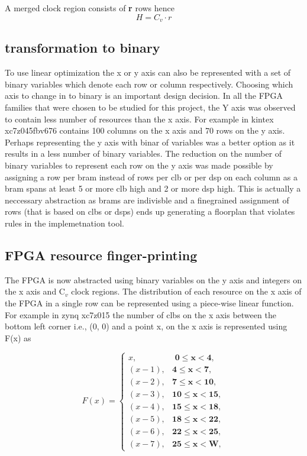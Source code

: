 \documentclass[conference]{IEEEtran}
\begin{document}
A merged clock region consists of \textbf{r} rows hence
\begin{equation}
H = C_v \cdot r
\end{equation}

\subsection{transformation to binary}
To use linear optimization the x or y axis can also be represented with a set of binary variables which denote each row or column respectively. Choosing which axis to change in to binary is an important design decision. In all the FPGA families that were chosen to be studied for this project, the Y axis was observed to contain less number of resources than the x axis. For example in kintex xc7z045fbv676 contains 100 columns on the x axis and 70 rows on the y axis. Perhaps representing the y axis with binar of variables was a better option as it results in a less number of binary variables. The reduction on the number of binary variables to represent each row on the y axis was made possible by assigning a row per bram instead of rows per clb or per dsp on each column as a bram spans at least 5 or more clb high and 2 or more dsp high. This is actually a neccessary abstraction as brams are indivisble and a finegrained assignment of rows (that is based on clbs or dsps) ends up generating a floorplan that violates rules in the implemetnation tool. \\

\subsection{FPGA resource finger-printing}
The FPGA is now abstracted using binary variables on the y axis and integers on the x axis and C$_v$ clock regions. The distribution of each resource on the x axis of the FPGA in a single row can be represented using a piece-wise linear function. For example in zynq xc7z015 the number of clbs on the x axis between the bottom left corner i.e., (0, 0) and a point x, on the x axis is represented using F(x) as  

\begin{equation}
F(x) = \begin{cases}
x, & \textbf{ 0$\leq$x$<$4}, \\
(x-1), & \textbf{4$\leq$x$<$7}, \\
(x-2), & \textbf{7$\leq$x$<$10}, \\
(x-3), & \textbf{10$\leq$x$<$15}, \\
(x-4), & \textbf{15$\leq$x$<$18}, \\
(x-5), & \textbf{18$\leq$x$<$22}, \\
(x-6), & \textbf{22$\leq$x$<$25}, \\
(x-7), & \textbf{25$\leq$x$<$W},
\end{cases}
\end{equation}
\end{document}
